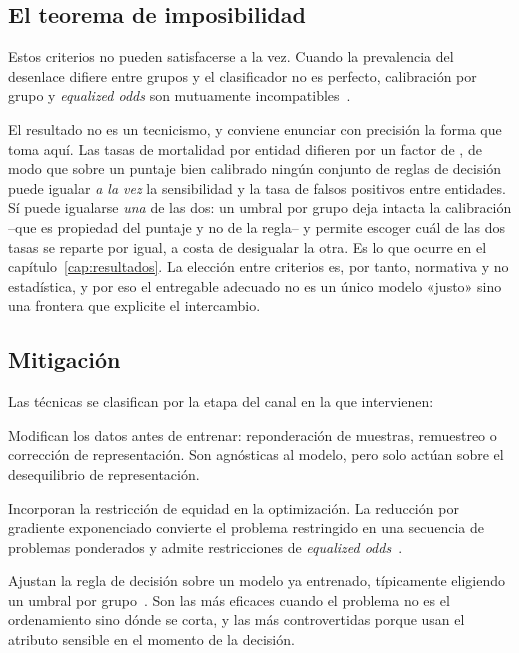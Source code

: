 \subsection{El teorema de imposibilidad}

Estos criterios no pueden satisfacerse a la vez. Cuando la prevalencia del
desenlace difiere entre grupos y el clasificador no es perfecto, calibración por
grupo y \emph{equalized odds} son mutuamente
incompatibles~\parencite{chouldechova2017,kleinberg2017}.

El resultado no es un tecnicismo, y conviene enunciar con precisión la forma que
toma aquí. Las tasas de mortalidad por entidad difieren por un factor de
\entFactorTasa, de modo que sobre un puntaje bien calibrado ningún conjunto de
reglas de decisión puede igualar \emph{a la vez} la sensibilidad y la tasa de
falsos positivos entre entidades. Sí puede igualarse \emph{una} de las dos: un
umbral por grupo deja intacta la calibración --que es propiedad del puntaje y no
de la regla-- y permite escoger cuál de las dos tasas se reparte por igual, a
costa de desigualar la otra. Es lo que ocurre en el capítulo~\ref{cap:resultados}.
La elección entre criterios es, por tanto, normativa y no estadística, y por eso
el entregable adecuado no es un único modelo «justo» sino una frontera que
explicite el intercambio.

\subsection{Mitigación}

Las técnicas se clasifican por la etapa del canal en la que intervienen:

\begin{description}[leftmargin=*,style=nextline]
  \item[Pre-procesamiento] Modifican los datos antes de entrenar: reponderación
    de muestras, remuestreo o corrección de representación. Son agnósticas al
    modelo, pero solo actúan sobre el desequilibrio de representación.
  \item[In-procesamiento] Incorporan la restricción de equidad en la
    optimización. La reducción por gradiente exponenciado convierte el problema
    restringido en una secuencia de problemas ponderados y admite restricciones
    de \emph{equalized odds}~\parencite{fairlearn2020}.
  \item[Post-procesamiento] Ajustan la regla de decisión sobre un modelo ya
    entrenado, típicamente eligiendo un umbral por grupo~\parencite{hardt2016}. Son
    las más eficaces cuando el problema no es el ordenamiento sino dónde se corta,
    y las más controvertidas porque usan el atributo sensible en el momento de la
    decisión.
\end{description}

